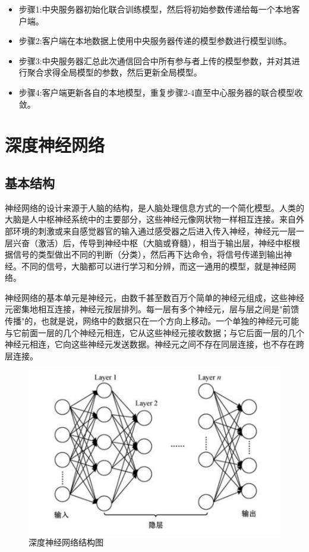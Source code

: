 \begin{itemize}
\item 步骤1:中央服务器初始化联合训练模型，然后将初始参数传递给每一个本地客户端。
\item 步骤2:客户端在本地数据上使用中央服务器传递的模型参数进行模型训练。
\item 步骤3:中央服务器汇总此次通信回合中所有参与者上传的模型参数，并对其进行聚合求得全局模型的参数，然后更新全局模型。
\item 步骤4:客户端更新各自的本地模型，重复步骤2-4直至中心服务器的联合模型收敛。
\end{itemize}


\section{深度神经网络}
\subsection{基本结构}
神经网络的设计来源于人脑的结构，是人脑处理信息方式的一个简化模型。人类的大脑是人中枢神经系统中的主要部分，这些神经元像网状物一样相互连接。来自外部环境的刺激或来自感觉器官的输入通过感受器之后进入传入神经，神经元一层一层兴奋（激活）后，传导到神经中枢（大脑或脊髓），相当于输出层，神经中枢根据信号的类型做出不同的判断（分类），然后再下达命令，将信号传递到输出神经。不同的信号，大脑都可以进行学习和分辨，而这一通用的模型，就是神经网络。

神经网络的基本单元是神经元，由数千甚至数百万个简单的神经元组成，这些神经元密集地相互连接，神经元按层排列。每一层有多个神经元，层与层之间是"前馈传播"的，也就是说，网络中的数据只在一个方向上移动。一个单独的神经元可能与它前面一层的几个神经元相连，它从这些神经元接收数据；与它后面一层的几个神经元相连，它向这些神经元发送数据。神经元之间不存在同层连接，也不存在跨层连接。

\begin{figure}[!hbt]
\centering
	\includegraphics[scale=0.5]{fig2/C2/深度神经网络结构图}%
	\caption{深度神经网络结构图}
	\label{fig:深度神经网络结构图}	
\end{figure}

